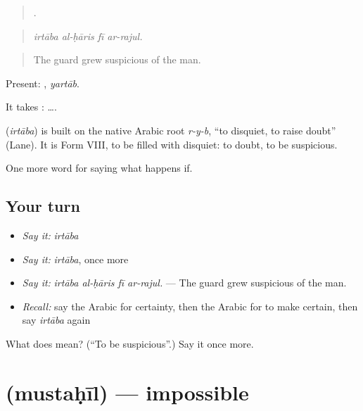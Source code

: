 \begin{quote}
   .
\end{quote}

\begin{quote}
\emph{irtāba al-ḥāris fī ar-rajul.}
\end{quote}

\begin{quote}
The guard grew suspicious of the man.
\end{quote}

Present: , \emph{yartāb}.

It takes :   ….

\begin{cousinweb}
\textbf{} (\emph{irtāba}) is built on the native Arabic root \emph{r-y-b}, \textquotedblleft{}to disquiet, to raise doubt\textquotedblright{} (Lane). It is Form VIII, to be filled with disquiet: to doubt, to be suspicious.
\end{cousinweb}

\begin{grammarlens}[title={What you've built}]
One more word for saying what happens if.
\end{grammarlens}

\subsection*{Your turn}
\begin{itemize}
\raggedright
  \item \emph{Say it:} \emph{irtāba}
  \item \emph{Say it:} \emph{irtāba}, once more
  \item \emph{Say it:} \emph{irtāba al-ḥāris fī ar-rajul.} — The guard grew suspicious of the man.
  \item \emph{Recall:} say the Arabic for certainty, then the Arabic for to make certain, then say \emph{irtāba} again
\end{itemize}

\begin{tcolorbox}[breakable,colback=teal!4,colframe=teal!35!black,title={Before you move on}]
What does  mean? (\textquotedblleft{}To be suspicious\textquotedblright{}.) Say it once more.
\end{tcolorbox}
\section[\texorpdfstring{\ar{مستحيل} (mustaḥīl)}{مستحيل (mustaḥīl)}]{ (mustaḥīl) — impossible}

